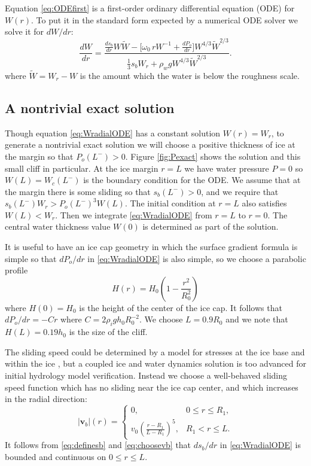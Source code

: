 \documentclass[gmd]{copernicus}   %
\newcommand\bv{\mathbf{v}}
\begin{document}
Equation \eqref{eq:ODEfirst} is a first-order ordinary differential equation (ODE) for $W(r)$.  To put it in the standard form expected by a numerical ODE solver we solve it for $dW/dr$:
\begin{equation}
\frac{dW}{dr} = \frac{\frac{ds_b}{dr} W \tilde W - \Big[\omega_0\, r W^{-1} + \frac{dP_o}{dr}\Big] W^{4/3} \tilde W^{2/3}}{\frac{1}{3} s_b W_r + \rho_w g W^{4/3} \tilde W^{2/3}}.
\label{eq:WradialODE}
\end{equation}
where $\tilde W = W_r - W$ is the amount which the water is below the roughness scale.

\subsection{A nontrivial exact solution}  \label{subsect:exactsoln}  Though equation \eqref{eq:WradialODE} has a constant solution $W(r)=W_r$, to generate a nontrivial exact solution we will choose a positive thickness of ice at the margin so that $P_o(L^-)>0$.  Figure \ref{fig:Pexact} shows the solution and this small cliff in particular.  At the ice margin $r=L$ we have water pressure $P=0$ so $W(L)=W_c(L^-)$ is the boundary condition for the ODE.  We assume that at the margin there is some sliding so that $s_b(L^-)>0$, and we require that $s_b(L^-) W_r > P_o(L^-)^3 W(L)$.  The initial condition at $r=L$ also satisfies $W(L) < W_r$.  Then we integrate \eqref{eq:WradialODE} from $r=L$ to $r=0$.  The central water thickness value $W(0)$ is determined as part of the solution.

It is useful to have an ice cap geometry in which the surface gradient formula is simple so that $dP_o/dr$ in \eqref{eq:WradialODE} is also simple, so we choose a parabolic profile
\begin{equation}
H(r) = H_0 \left(1 - \frac{r^2}{R_0^2} \right) \label{eq:choosebodvardssonh}
\end{equation}
where $H(0)=H_0$ is the height of the center of the ice cap.  It follows that $dP_o/dr = - C r$ where $C=2\rho_i g h_0 R_0^{-2}$.  We choose $L=0.9 R_0$ and we note that $H(L)=0.19 h_0$ is the size of the cliff.

The sliding speed could be determined by a model for stresses at the ice base and within the ice \citep{GreveBlatter2009}, but a coupled ice and water dynamics solution is too advanced for initial hydrology model verification.  Instead we choose a well-behaved sliding speed function which has no sliding near the ice cap center, and which increases in the radial direction:
\begin{equation}
|\bv_b|(r) = \begin{cases} 0, & 0 \le r \le R_1, \\
                           v_0  \left(\frac{r-R_1}{L-R_1}\right)^5, & R_1 < r \le L.
             \end{cases}  \label{eq:choosevb}
\end{equation}
It follows from \eqref{eq:definesb} and \eqref{eq:choosevb} that $ds_b/dr$ in \eqref{eq:WradialODE} is bounded and continuous on $0\le r \le L$.
\end{document}
